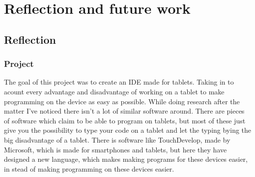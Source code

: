 \documentclass[a4paper,12pt]{report}
\begin{document}

\chapter{Reflection and future work}

\section{Reflection}
\subsection{Project}
The goal of this project was to create an IDE made for tablets. Taking in to acount every advantage and disadvantage of working on a tablet to make programming on the device as easy as possible. While doing research 
after the matter I've noticed there isn't a lot of similar software around. There are pieces of software which claim to be able to program on tablets, but most of these just give you the possibility to type your code on
a tablet and let the typing bying the big disadvantage of a tablet. There is software like TouchDevelop, made by Microsoft, which is made for smartphones and tablets, but here they have designed a new language, which makes 
making programs for these devices easier, in stead of making programming on these devices easier.
\end{document}
